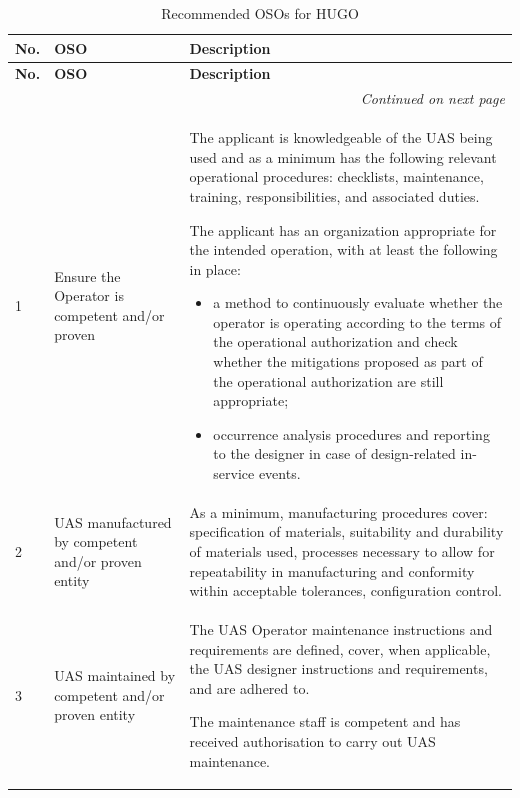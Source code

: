 \begin{longtable}{|p{0.5cm}|p{3cm}|p{\dimexpr\textwidth-3.5cm-6\tabcolsep-4\arrayrulewidth\relax}|}
\caption{Recommended OSOs for HUGO \cite{Jarus_main}\cite{Jarus_Annex_E}}
\label{tab:OSOs_the_table_tm} \\
\hline
\textbf{No.} & \textbf{OSO} & \textbf{Description} \\
\hline\hline
\endfirsthead

\hline
\textbf{No.} & \textbf{OSO} & \textbf{Description} \\
\hline\hline
\endhead

\hline
\multicolumn{3}{r}{\textit{Continued on next page}} \\
\endfoot

\hline
\endlastfoot

1 & Ensure the Operator is competent and/or proven 
& The applicant is knowledgeable of the UAS being used and as a minimum has the following relevant operational procedures: checklists, maintenance, training, responsibilities, and associated duties.

The applicant has an organization appropriate for the intended operation, with at least the following in place:
\begin{itemize}
    \item a method to continuously evaluate whether the operator is operating according to the terms of the operational authorization and check whether the mitigations proposed as part of the operational authorization are still appropriate;
    \item occurrence analysis procedures and reporting to the designer in case of design-related in-service events.
\end{itemize}
\\ \hline

2 & UAS manufactured by competent and/or proven entity 
& As a minimum, manufacturing procedures cover: specification of materials, suitability and durability of materials used, processes necessary to allow for repeatability in manufacturing and conformity within acceptable tolerances, configuration control.
\\ \hline

3 & UAS maintained by competent and/or proven entity 
& The UAS Operator maintenance instructions and requirements are defined, cover, when applicable, the UAS designer instructions and requirements, and are adhered to.

The maintenance staff is competent and has received authorisation to carry out UAS maintenance.


\end{longtable}
